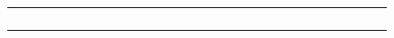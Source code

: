 \begin{tabular}{rhchchchchchchchchchchchch}
\cite{TLD:OSR12}&&&&&&&&&&&&&&&&&&&&&&&&&\\
\cite{TLD:OSR12}&&&&&&&&&&&&&&&&&&&&&&&&&\\
\cite{KMKB:ESECFSE13}&&&&&&&&&&&&&&&&&&&&&&&&&\\
\addlinespace[2pt]
\cite{SRKKS:APSEC08}&&&&&&&&&&&&&&&&&&&&&&&&&\\
\bottomrule
\end{tabular}
